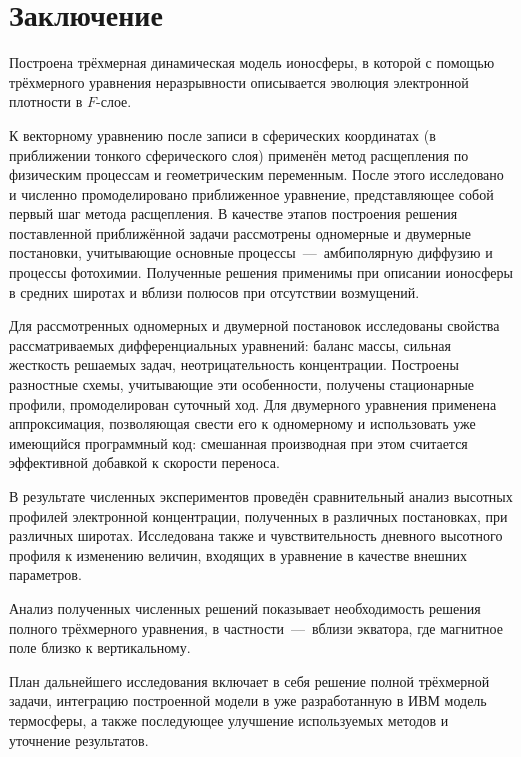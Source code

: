 \documentclass[14pt, a4paper, fleqn]{extarticle}
\begin{document}
\newpage

\section{Заключение}

Построена трёхмерная динамическая модель ионосферы, в которой с помощью трёхмерного уравнения неразрывности описывается эволюция электронной плотности в $F$-слое.

К векторному уравнению после записи в сферических координатах (в приближении тонкого сферического слоя) применён метод расщепления по физическим процессам и геометрическим переменным. После этого исследовано и численно промоделировано приближенное уравнение, представляющее собой первый шаг метода расщепления. В качестве этапов построения решения поставленной приближённой задачи рассмотрены одномерные и двумерные постановки, учитывающие основные процессы~---~амбиполярную диффузию и процессы фотохимии. Полученные решения применимы при описании ионосферы в средних широтах и вблизи полюсов при отсутствии возмущений.

Для рассмотренных одномерных и двумерной постановок исследованы свойства рассматриваемых дифференциальных уравнений: баланс массы, сильная жесткость решаемых задач, неотрицательность концентрации. Построены разностные схемы, учитывающие эти особенности, получены стационарные профили, промоделирован суточный ход. Для двумерного уравнения применена аппроксимация, позволяющая свести его к одномерному и использовать уже имеющийся программный код: смешанная производная при этом считается эффективной добавкой к скорости переноса.

В результате численных экспериментов проведён сравнительный анализ высотных профилей электронной концентрации, полученных в различных постановках, при различных широтах. Исследована также и чувствительность дневного высотного профиля к изменению величин, входящих в уравнение в качестве внешних параметров.

Анализ полученных численных решений показывает необходимость решения полного трёхмерного уравнения, в частности~---~вблизи экватора, где магнитное поле близко к вертикальному.

План дальнейшего исследования включает в себя решение полной трёхмерной задачи, интеграцию построенной модели в уже разработанную в ИВМ модель термосферы, а также последующее улучшение используемых методов и уточнение результатов.

\newpage
{}
\end{document}
